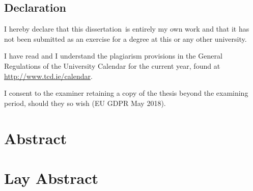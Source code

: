\documentclass[a4paper,oneside,12pt]{book}
\title{\thesistitle}
\author{\authorname}
\newcommand{\typeofthesis}{dissertation} %
\numberwithin{equation}{chapter} %
\begin{document}

\section*{\Huge\textcolor{tcd_blue}{Declaration}}
\vspace{1cm}
I hereby declare that this \typeofthesis\ is entirely my own work and that it has not been submitted as an exercise for a degree at this or any other university.

\vspace{1cm}
I have read and I understand the plagiarism provisions in the General Regulations of the University Calendar for the current year, found at \url{http://www.tcd.ie/calendar}.
\vspace{1cm}


I consent to the examiner retaining a copy of the thesis beyond the examining period, should they so wish (EU GDPR May 2018).
\vspace{1cm}



\chapter*{Abstract}



\chapter*{Lay Abstract}
\end{document}
